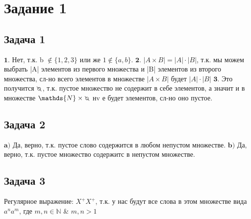 \documentclass[a4paper,14pt]{article} %
\begin{document}

\section{Задание 1}
\subsection{Задача 1}

$\textbf{1.}$ Нет, т.к. b $\notin \{1, 2, 3\}$ или же $1 \notin \{a, b\}$.
\newline
$\textbf{2.}$ $|A \times B| = |A| \cdot |B|$, т.к. мы можем выбрать |A| элементов из первого множества 
и |B| элементов из второго множества, сл-но всего элементов в множестве $|A \times B|$ будет $|A| \cdot |B|$
\newline
$\textbf{3.}$ Это получится $\invdiameter$, т.к. пустое множество не содержит в себе элементов, а значит 
и в множестве $\mathds{N} \times \invdiameter$ нv е будет элементов, сл-но оно пустое.

\subsection{Задача 2}
$\textbf{a)}$ Да, верно, т.к. пустое слово содержится в любом непустом множестве.
\newline
$\textbf{b)}$ Да, верно, т.к. пустое множество содержитс в непустом множестве.

\subsection{Задача 3}
Регулярное выражение: $X^{+}X^{+}$, т.к. у нас будут все слова в этом множестве вида $a^{n}a^{m}$, где $m, n \in \mathds{N}$ \& $m, n>1$
\end{document}
